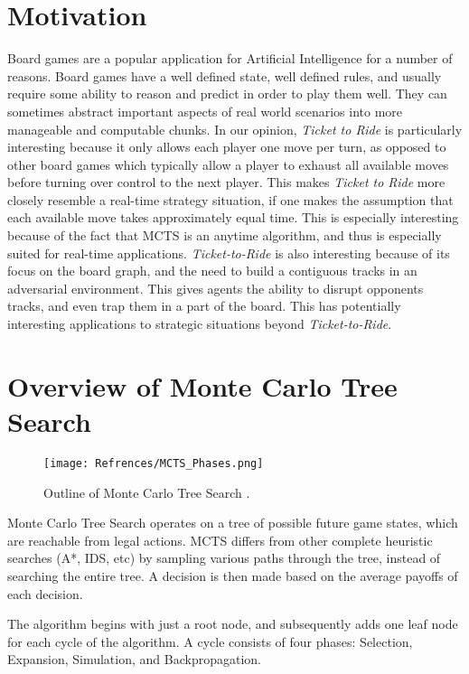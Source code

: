 \documentclass[11pt, letterpaper, twoside]{article}
\begin{document}
\section{Motivation}

Board games are a popular application for Artificial Intelligence for a number of reasons. Board games have a well defined state, well defined rules, and usually require some ability to reason and predict in order to play them well. They can sometimes abstract important aspects of real world scenarios into more manageable and computable chunks. In our opinion, \textit{Ticket to Ride} is particularly interesting because it only allows each player one move per turn, as opposed to other board games which typically allow a player to exhaust all available moves before turning over control to the next player. This makes \textit{Ticket to Ride} more closely resemble a real-time strategy situation, if one makes the assumption that each available move takes approximately equal time. This is especially interesting because of the fact that MCTS is an anytime algorithm, and thus is especially suited for real-time applications. \textit{Ticket-to-Ride} is also interesting because of its focus on the board graph, and the need to build a contiguous tracks in an adversarial environment. This gives agents the ability to disrupt opponents tracks, and even trap them in a part of the board. This has potentially interesting applications to strategic situations beyond \textit{Ticket-to-Ride}.

\section{Overview of Monte Carlo Tree Search}

\begin{figure}
  \texttt{[image: Refrences/MCTS\_Phases.png]}
  \caption{Outline of Monte Carlo Tree Search \cite{mcts_survey}.}
  \label{fig:mcts_outline}
\end{figure}

Monte Carlo Tree Search operates on a tree of possible future game states, which are reachable from legal actions. MCTS differs from other complete heuristic searches (A*, IDS, etc) by sampling various paths through the tree, instead of searching the entire tree. A decision is then made based on the average payoffs of each decision.
 
The algorithm \cite{mcts_inaugural} begins with just a root node, and subsequently adds one leaf node for each cycle of the algorithm. A cycle consists of four phases: Selection, Expansion, Simulation, and Backpropagation.
\end{document}
